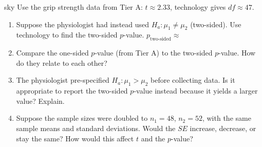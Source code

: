 \documentclass[10pt]{article}
\begin{document}
\begin{scenariobox}{sky}
Use the grip strength data from Tier A: $t \approx 2.33$, technology gives $df \approx 47$.

\begin{enumerate}[label=\alph*.]
  \item Suppose the physiologist had instead used $H_a: \mu_1 \ne \mu_2$ (two-sided).
        Use technology to find the two-sided $p$-value. \quad $p_{\text{two-sided}} \approx$ 

  \item Compare the one-sided $p$-value (from Tier A) to the two-sided $p$-value.
        How do they relate to each other? 

  \item The physiologist pre-specified $H_a: \mu_1 > \mu_2$ before collecting data.
        Is it appropriate to report the two-sided $p$-value instead because it yields
        a larger value? Explain. 
        \ansline{}

  \item Suppose the sample sizes were doubled to $n_1 = 48$, $n_2 = 52$, with the same
        sample means and standard deviations. Would the $SE$ increase, decrease, or stay
        the same? How would this affect $t$ and the $p$-value? 
        \ansline{}
\end{enumerate}
\end{scenariobox}
\end{document}
